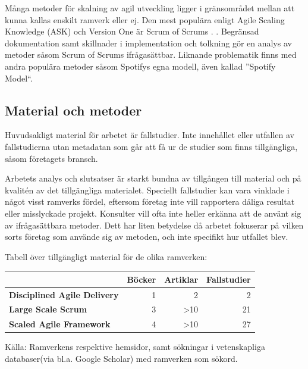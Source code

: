 		Många metoder för skalning av agil utveckling ligger i gränsområdet mellan att kunna kallas enskilt ramverk eller ej. Den mest populära enligt Agile Scaling Knowledge (ASK) och Version One är Scrum of Scrums \cite{ask_matrix} \cite{version_one_report}. . Begränsad dokumentation samt skillnader i implementation och tolkning gör en analys av metoder såsom Scrum of Scrums ifrågasättbar. Liknande problematik finns med andra populära metoder såsom Spotifys egna modell, även kallad ''Spotify Model``.
		
	\subsection{Material och metoder}
		
		Huvudsakligt material för arbetet är fallstudier. Inte innehållet eller utfallen av fallstudierna utan metadatan som går att få ur de studier som finns tillgängliga, såsom företagets bransch.
				
		Arbetets analys och slutsatser är starkt bundna av tillgången till material och på kvalitén av det tillgängliga materialet. Speciellt fallstudier kan vara vinklade i något visst ramverks fördel, eftersom företag inte vill rapportera dåliga resultat eller misslyckade projekt. Konsulter vill ofta inte heller erkänna att de använt sig av ifrågasättbara metoder.
		Dett har liten betydelse då arbetet fokuserar på vilken sorts företag som använde sig av metoden, och inte specifikt hur utfallet blev.
		
		
		Tabell över tillgängligt material för de olika ramverken:

		\begin{center}
		\begin{tabular}{ >{\bfseries}l | r | r | r }
			 	 						& Böcker & Artiklar & Fallstudier 	\\ \hline
			Disciplined Agile Delivery 	& 1 	& 2			& 2 			\\ \hline
			Large Scale Scrum 			& 3 	& >10		& 21 			\\ \hline
			Scaled Agile Framework 		& 4 	& >10		& 27 			\\ 
		\end{tabular}
		\end{center}
		
		Källa: Ramverkens respektive hemsidor\cite{dad_web, less_web, safe_web}, samt sökningar i vetenskapliga databaser(via bl.a. Google Scholar) med ramverken som sökord.
		
